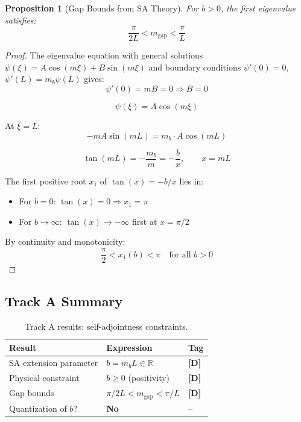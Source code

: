 \documentclass[11pt,a4paper]{article}
\newcommand{\mgap}{m_{\mathrm{gap}}}
\newcommand{\mb}{m_b}
\newcommand{\tagD}{\textbf{[D]}}
\theoremstyle{definition}
\theoremstyle{plain}
\newtheorem{proposition}{Proposition}[section]
\theoremstyle{remark}
\begin{document}
\begin{proposition}[Gap Bounds from SA Theory]
\label{prop:gap-bounds}
For $b > 0$, the first eigenvalue satisfies:
\begin{equation}
\frac{\pi}{2L} < \mgap < \frac{\pi}{L}
\label{eq:gap-bounds}
\end{equation}
\end{proposition}

\begin{proof}
The eigenvalue equation with general solutions $\psi(\xi) = A\cos(m\xi) + B\sin(m\xi)$
and boundary conditions $\psi'(0) = 0$, $\psi'(L) = \mb\psi(L)$ gives:
\begin{equation}
\psi'(0) = mB = 0 \Rightarrow B = 0
\label{eq:bc-0}
\end{equation}

\begin{equation}
\psi(\xi) = A\cos(m\xi)
\label{eq:solution}
\end{equation}

At $\xi = L$:
\begin{equation}
-mA\sin(mL) = \mb \cdot A\cos(mL)
\label{eq:bc-L}
\end{equation}

\begin{equation}
\tan(mL) = -\frac{\mb}{m} = -\frac{b}{x}, \qquad x = mL
\label{eq:transcendental}
\end{equation}

The first positive root $x_1$ of $\tan(x) = -b/x$ lies in:
\begin{itemize}
\item For $b = 0$: $\tan(x) = 0 \Rightarrow x_1 = \pi$
\item For $b \to \infty$: $\tan(x) \to -\infty$ first at $x = \pi/2$
\end{itemize}

By continuity and monotonicity:
\begin{equation}
\frac{\pi}{2} < x_1(b) < \pi \quad \text{for all } b > 0
\label{eq:x1-bounds}
\end{equation}
\end{proof}

\subsection{Track A Summary}

\begin{table}[htbp]
\centering
\caption{Track A results: self-adjointness constraints.}
\label{tab:track-a}
\begin{tabular}{@{}lll@{}}
\toprule
Result & Expression & Tag \\
\midrule
SA extension parameter & $b = \mb L \in \mathbb{R}$ & \tagD{} \\
Physical constraint & $b \geq 0$ (positivity) & \tagD{} \\
Gap bounds & $\pi/2L < \mgap < \pi/L$ & \tagD{} \\
Quantization of $b$? & \textbf{No} & -- \\
\bottomrule
\end{tabular}
\end{table}
\end{document}
